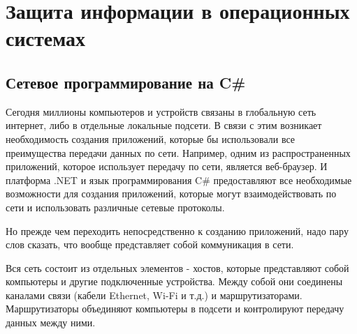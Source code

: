 \documentclass[a4paper, 12pt]{report}
\begin{document}
	
	
	
	\chapter{Защита информации в операционных системах}
	\section{Сетевое программирование на C#}
	Сегодня миллионы компьютеров и устройств связаны в глобальную сеть интернет, либо в отдельные локальные подсети. В связи с этим возникает необходимость создания приложений, которые бы использовали все преимущества передачи данных по сети. Например, одним из распространенных приложений, которое использует передачу по сети, является веб-браузер. И платформа .NET и язык программирования C# предоставляют все необходимые возможности для создания приложений, которые могут взаимодействовать по сети и использовать различные сетевые протоколы.
	
	Но прежде чем переходить непосредственно к созданию приложений, надо пару слов сказать, что вообще представляет собой коммуникация в сети.
	
	Вся сеть состоит из отдельных элементов - хостов, которые представляют собой компьютеры и другие подключенные устройства. Между собой они соединены каналами связи (кабели Ethernet, Wi-Fi и т.д.) и маршрутизаторами. Маршрутизаторы объединяют компьютеры в подсети и контролируют передачу данных между ними.
	
\end{document}

